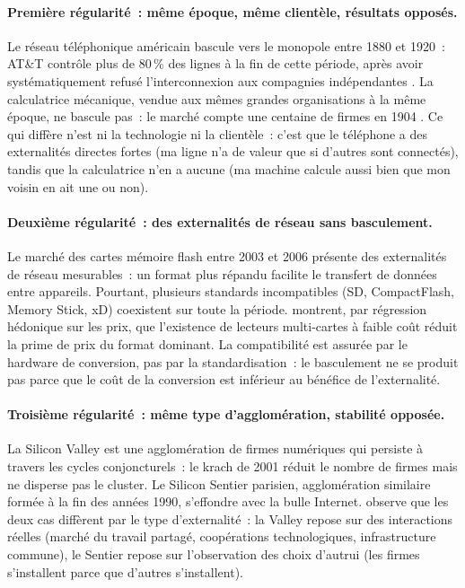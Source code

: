 \paragraph{Première régularité~: même époque, même clientèle, résultats opposés.}

Le réseau téléphonique américain bascule vers le monopole entre 1880 et 1920~: AT\&T contrôle plus de 80\,\% des lignes à la fin de cette période, après avoir systématiquement refusé l'interconnexion aux compagnies indépendantes \parencite{beauchamp_invented_2010}. La calculatrice mécanique, vendue aux mêmes grandes organisations à la même époque, ne bascule pas~: le marché compte une centaine de firmes en 1904 \parencite{cortada_before_1993}. Ce qui diffère n'est ni la technologie ni la clientèle~: c'est que le téléphone a des externalités directes fortes (ma ligne n'a de valeur que si d'autres sont connectés), tandis que la calculatrice n'en a aucune (ma machine calcule aussi bien que mon voisin en ait une ou non).

\paragraph{Deuxième régularité~: des externalités de réseau sans basculement.}

Le marché des cartes mémoire flash entre 2003 et 2006 présente des externalités de réseau mesurables~: un format plus répandu facilite le transfert de données entre appareils. Pourtant, plusieurs standards incompatibles (SD, CompactFlash, Memory Stick, xD) coexistent sur toute la période. \textcite{liu_standards_2012} montrent, par régression hédonique sur les prix, que l'existence de lecteurs multi-cartes à faible coût réduit la prime de prix du format dominant. La compatibilité est assurée par le hardware de conversion, pas par la standardisation~: le basculement ne se produit pas parce que le coût de la conversion est inférieur au bénéfice de l'externalité.

\paragraph{Troisième régularité~: même type d'agglomération, stabilité opposée.}

La Silicon Valley est une agglomération de firmes numériques qui persiste à travers les cycles conjoncturels~: le krach de 2001 réduit le nombre de firmes mais ne disperse pas le cluster. Le Silicon Sentier parisien, agglomération similaire formée à la fin des années 1990, s'effondre avec la bulle Internet. \textcite{vicente_externalites_2002} observe que les deux cas diffèrent par le type d'externalité~: la Valley repose sur des interactions réelles (marché du travail partagé, coopérations technologiques, infrastructure commune), le Sentier repose sur l'observation des choix d'autrui (les firmes s'installent parce que d'autres s'installent).

